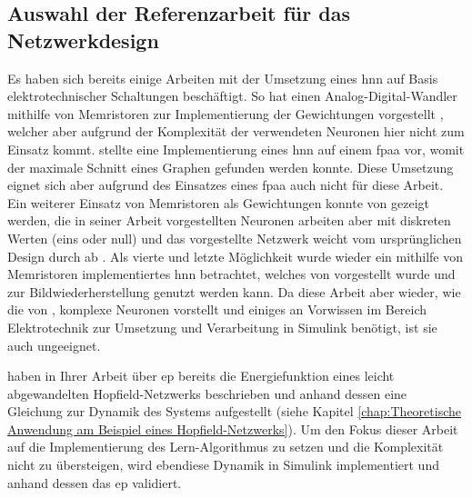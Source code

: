 \subsection{Auswahl der Referenzarbeit für das Netzwerkdesign}
\label{chap:Auswahl der Referenzarbeit für das Netzwerkdesign}

Es haben sich bereits einige Arbeiten mit der Umsetzung eines \ac{hnn} auf Basis elektrotechnischer Schaltungen beschäftigt. So hat \zb \citeauthor{Guo2015} einen Analog-Digital-Wandler mithilfe von Memristoren zur Implementierung der Gewichtungen vorgestellt \cite{Guo2015}, welcher aber aufgrund der Komplexität der verwendeten Neuronen hier nicht zum Einsatz kommt. \citeauthor{Mathews2023} stellte \citeyear{Mathews2023} eine Implementierung eines \ac{hnn} auf einem \ac{fpaa} vor, womit der maximale Schnitt eines Graphen gefunden werden konnte. Diese Umsetzung eignet sich aber aufgrund des Einsatzes eines \ac{fpaa} auch nicht für diese Arbeit. Ein weiterer Einsatz von Memristoren als Gewichtungen konnte von \citeauthor{Hu2015} gezeigt werden, die in seiner Arbeit vorgestellten Neuronen arbeiten aber mit diskreten Werten (eins oder null) und das vorgestellte Netzwerk weicht vom ursprünglichen Design durch \citeauthor{Hopfield1982} ab \cite{Hu2015}. Als vierte und letzte Möglichkeit wurde wieder ein mithilfe von Memristoren implementiertes \ac{hnn} betrachtet, welches \citeyear{Hong2020} von \citeauthor{Hong2020} vorgestellt wurde und zur Bildwiederherstellung genutzt werden kann. Da diese Arbeit aber wieder, wie die von \cite{Guo2015}, komplexe Neuronen vorstellt und einiges an Vorwissen im Bereich Elektrotechnik zur Umsetzung und Verarbeitung in Simulink benötigt, ist sie auch ungeeignet.

\citeauthor{Scellier2017} haben in Ihrer Arbeit über \ac{ep} bereits die Energiefunktion eines leicht abgewandelten Hopfield-Netzwerks beschrieben und anhand dessen eine Gleichung zur Dynamik des Systems aufgestellt (siehe Kapitel \ref{chap:Theoretische Anwendung am Beispiel eines Hopfield-Netzwerks}). Um den Fokus dieser Arbeit auf die Implementierung des Lern-Algorithmus zu setzen und die Komplexität nicht zu übersteigen, wird ebendiese Dynamik in Simulink implementiert und anhand dessen das \ac{ep} validiert.

